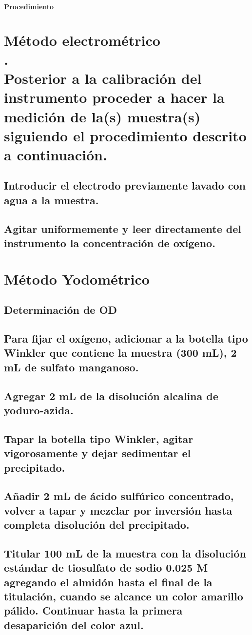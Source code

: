 \documentclass[spanish,12pt,letterpaper,titlepage]{article}
\theoremstyle{definition}
\begin{document}
	\Large{\textbf{Procedimiento}}
	\normalsize
	\section{Método electrométrico\\ \tiny.\normalsize\\Posterior a la calibración del instrumento proceder a hacer la medición de la(s) muestra(s) siguiendo el procedimiento descrito a continuación.}\label{9.1}
	\subsection{Introducir el electrodo previamente lavado con agua a la muestra.}\label{9.1.1}
	\subsection{Agitar uniformemente y leer directamente del instrumento la concentración de oxígeno.} \label{9.1.2}
	\section{Método Yodométrico} \label{9.2}
	\subsection{Determinación de OD}\label{9.2.1}
	\subsection{Para fijar el oxígeno, adicionar a la botella tipo Winkler que contiene la muestra (300 mL), 2 mL de sulfato manganoso.}\label{9.2.2}
	\subsection{Agregar 2 mL de la disolución alcalina de yoduro-azida.}\label{9.2.3}
	\subsection{Tapar la botella tipo Winkler, agitar vigorosamente y dejar sedimentar el precipitado.}\label{9.2.4}
	\subsection{Añadir 2 mL de ácido sulfúrico concentrado, volver a tapar y mezclar por inversión hasta completa disolución del precipitado.}\label{9.2.5}
	\subsection{Titular 100 mL de la muestra con la disolución estándar de tiosulfato de sodio 0.025 M agregando el almidón hasta el final de la titulación, cuando se alcance un color amarillo pálido. Continuar hasta la primera desaparición del color azul.}\label{9.2.6}
\end{document}
